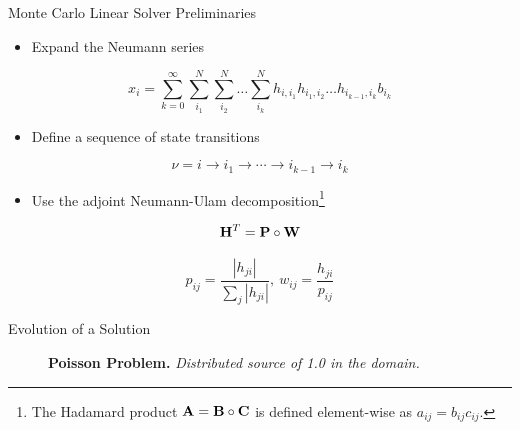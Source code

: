 \documentclass{beamer}
\begin{document}
\begin{frame}{Monte Carlo Linear Solver Preliminaries}

  \begin{itemize}
  \item Expand the Neumann series
  \end{itemize}

  \[
  x_i = \sum_{k=0}^{\infty}\sum_{i_1}^{N}\sum_{i_2}^{N}\ldots
  \sum_{i_k}^{N}h_{i,i_1}h_{i_1,i_2}\ldots h_{i_{k-1},i_k}b_{i_k}
  \]

  \begin{itemize}
  \item Define a sequence of state transitions
  \end{itemize}
  
  \[
  \nu = i \rightarrow i_1 \rightarrow \cdots \rightarrow i_{k-1}
  \rightarrow i_{k}
  \]

  \begin{itemize}
  \item Use the adjoint Neumann-Ulam
    decomposition\let\thefootnote\relax\footnote{The Hadamard product
      $\mathbf{A} = \mathbf{B} \circ \mathbf{C}$ is defined element-wise as
      $a_{ij} = b_{ij} c_{ij}$.}
  \end{itemize}

  \[
  \mathbf{H}^{T} = \mathbf{P} \circ \mathbf{W}
  \]

  \[
  p_{ij} = \frac{|h_{ji}|}{\sum_j |h_{ji}|},\ w_{ij} =
  \frac{h_{ji}}{p_{ij}}
  \]

\end{frame}

\begin{frame}{Evolution of a Solution}

  \begin{figure}[htpb!]
    \begin{center}
      \scalebox{1.0}{  }
    \end{center}
    \caption{\textbf{Poisson Problem.}
      \textit{Distributed source of 1.0 in the domain.}}
  \end{figure}

\end{frame}
\end{document}
